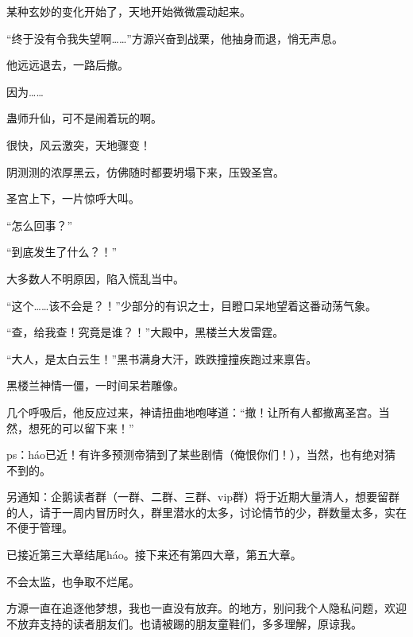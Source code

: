\begin{this_body}
某种玄妙的变化开始了，天地开始微微震动起来。

“终于没有令我失望啊……”方源兴奋到战栗，他抽身而退，悄无声息。

他远远退去，一路后撤。

因为……

蛊师升仙，可不是闹着玩的啊。

很快，风云激突，天地骤变！

阴测测的浓厚黑云，仿佛随时都要坍塌下来，压毁圣宫。

圣宫上下，一片惊呼大叫。

“怎么回事？”

“到底发生了什么？！”

大多数人不明原因，陷入慌乱当中。

“这个……该不会是？！”少部分的有识之士，目瞪口呆地望着这番动荡气象。

“查，给我查！究竟是谁？！”大殿中，黑楼兰大发雷霆。

“大人，是太白云生！”黑书满身大汗，跌跌撞撞疾跑过来禀告。

黑楼兰神情一僵，一时间呆若雕像。

几个呼吸后，他反应过来，神请扭曲地咆哮道：“撤！让所有人都撤离圣宫。当然，想死的可以留下来！”

ps：háo已近！有许多预测帝猜到了某些剧情（俺恨你们！），当然，也有绝对猜不到的。

另通知：企鹅读者群（一群、二群、三群、vip群）将于近期大量清人，想要留群的人，请于一周内冒历时久，群里潜水的太多，讨论情节的少，群数量太多，实在不便于管理。

已接近第三大章结尾háo。接下来还有第四大章，第五大章。

不会太监，也争取不烂尾。

方源一直在追逐他梦想，我也一直没有放弃。的地方，别问我个人隐私问题，欢迎不放弃支持的读者朋友们。也请被踢的朋友童鞋们，多多理解，原谅我。

\end{this_body}

